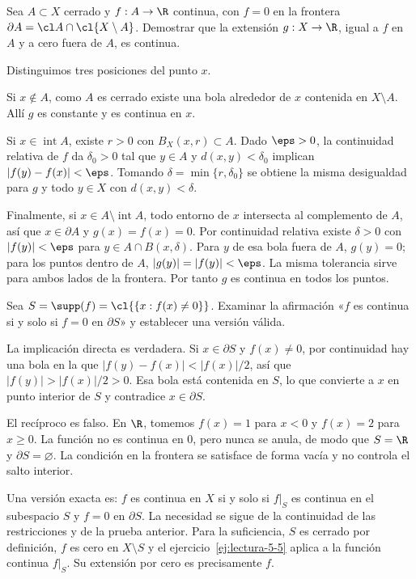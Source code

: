 \begin{ejercicio}\label{ej:lectura-5-5}
Sea $A\subset X$ cerrado y $f:A\to\R$ continua, con $f=0$ en la frontera $\partial A=\cl A\cap\cl{X\setminus A}$. Demostrar que la extensión $g:X\to\R$, igual a $f$ en $A$ y a cero fuera de $A$, es continua.
\end{ejercicio}
\begin{solucion}
Distinguimos tres posiciones del punto $x$.

Si $x\notin A$, como $A$ es cerrado existe una bola alrededor de $x$ contenida en $X\setminus A$. Allí $g$ es constante y es continua en $x$.

Si $x\in\operatorname{int}A$, existe $r>0$ con $B_X(x,r)\subset A$. Dado $\eps>0$, la continuidad relativa de $f$ da $\delta_0>0$ tal que $y\in A$ y $d(x,y)<\delta_0$ implican $|f(y)-f(x)|<\eps$. Tomando $\delta=\min\{r,\delta_0\}$ se obtiene la misma desigualdad para $g$ y todo $y\in X$ con $d(x,y)<\delta$.

Finalmente, si $x\in A\setminus\operatorname{int}A$, todo entorno de $x$ intersecta al complemento de $A$, así que $x\in\partial A$ y $g(x)=f(x)=0$. Por continuidad relativa existe $\delta>0$ con $|f(y)|<\eps$ para $y\in A\cap B(x,\delta)$. Para $y$ de esa bola fuera de $A$, $g(y)=0$; para los puntos dentro de $A$, $|g(y)|=|f(y)|<\eps$. La misma tolerancia sirve para ambos lados de la frontera. Por tanto $g$ es continua en todos los puntos.
\end{solucion}

\begin{ejercicio}\label{ej:lectura-5-6}
Sea $S=\supp(f)=\cl{\{x:f(x)\ne0\}}$. Examinar la afirmación «$f$ es continua si y solo si $f=0$ en $\partial S$» y establecer una versión válida.
\end{ejercicio}
\begin{solucion}
La implicación directa es verdadera. Si $x\in\partial S$ y $f(x)\ne0$, por continuidad hay una bola en la que $|f(y)-f(x)|<|f(x)|/2$, así que $|f(y)|>|f(x)|/2>0$. Esa bola está contenida en $S$, lo que convierte a $x$ en punto interior de $S$ y contradice $x\in\partial S$.

El recíproco es falso. En $\R$, tomemos $f(x)=1$ para $x<0$ y $f(x)=2$ para $x\ge0$. La función no es continua en $0$, pero nunca se anula, de modo que $S=\R$ y $\partial S=\varnothing$. La condición en la frontera se satisface de forma vacía y no controla el salto interior.

Una versión exacta es: $f$ es continua en $X$ si y solo si $f|_S$ es continua en el subespacio $S$ y $f=0$ en $\partial S$. La necesidad se sigue de la continuidad de las restricciones y de la prueba anterior. Para la suficiencia, $S$ es cerrado por definición, $f$ es cero en $X\setminus S$ y el ejercicio~\ref{ej:lectura-5-5} aplica a la función continua $f|_S$. Su extensión por cero es precisamente $f$.
\end{solucion}

